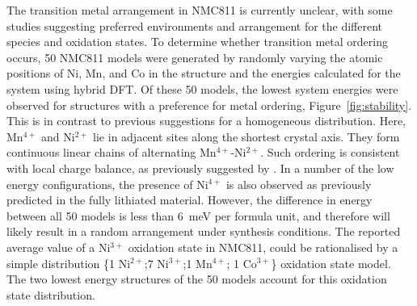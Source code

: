 \documentclass[journal=jacsat,manuscript=article]{achemso}
\begin{document}
The transition metal arrangement in NMC811 is currently unclear, with some studies suggesting preferred environments and arrangement for the different species and oxidation states.\cite{Sun_JPhysChemC2017,zheng2019,zheng2019,Zheng-acs.jpclett-2017}
To determine whether transition metal ordering occurs, 50 NMC811 models were generated by randomly varying the atomic positions of Ni, Mn, and Co in the structure and the energies calculated for the system using hybrid DFT.
Of these 50 models, the lowest system energies were observed for structures with a preference for metal ordering, Figure~\ref{fig:stability}.
This is in contrast to previous suggestions for a homogeneous distribution.\cite{Sun_JPhysChemC2017}
Here, Mn$^{4+}$ and Ni$^{2+}$ lie in adjacent sites along the shortest crystal axis.
They form continuous linear chains of alternating Mn$^{4+}$-Ni$^{2+}$.
Such ordering is consistent with local charge balance, as previously suggested by \citeauthor{Zeng_ChemMater2007}.\cite{Zeng_ChemMater2007} 
In a number of the low energy configurations, the presence of Ni$^{4+}$ is also observed as previously predicted in the fully lithiated material.\cite{susai2019improving}
However, the difference in energy between all 50 models is less than \SI{6}{meV} per formula unit, and therefore will likely result in a random arrangement under synthesis conditions.
The reported average value of a Ni$^{3+}$ oxidation state in NMC811,\cite{Zhu_JMatChemA2019,Katharina-chemmater, Kondrakov_JPhysChemC2017} could be rationalised by a simple distribution \{1 Ni$^{2+}$;7 Ni$^{3+}$;1 Mn$^{4+}$; 1 Co$^{3+}$\} oxidation state model. 
The two lowest energy structures of the 50 models account for this oxidation state distribution.
\end{document}
